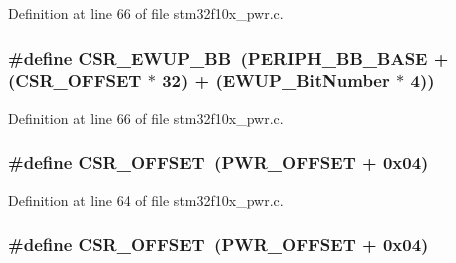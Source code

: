 Definition at line 66 of file stm32f10x\+\_\+pwr.\+c.

\subsubsection[{\texorpdfstring{C\+S\+R\+\_\+\+E\+W\+U\+P\+\_\+\+BB}{CSR_EWUP_BB}}]{\setlength{\rightskip}{0pt plus 5cm}\#define C\+S\+R\+\_\+\+E\+W\+U\+P\+\_\+\+BB~({\bf P\+E\+R\+I\+P\+H\+\_\+\+B\+B\+\_\+\+B\+A\+SE} + ({\bf C\+S\+R\+\_\+\+O\+F\+F\+S\+ET} $\ast$ 32) + ({\bf E\+W\+U\+P\+\_\+\+Bit\+Number} $\ast$ 4))}\hypertarget{group___p_w_r___private___defines_gaaff864595f697850b19173b0bca991b0}{}\label{group___p_w_r___private___defines_gaaff864595f697850b19173b0bca991b0}


Definition at line 66 of file stm32f10x\+\_\+pwr.\+c.

\subsubsection[{\texorpdfstring{C\+S\+R\+\_\+\+O\+F\+F\+S\+ET}{CSR_OFFSET}}]{\setlength{\rightskip}{0pt plus 5cm}\#define C\+S\+R\+\_\+\+O\+F\+F\+S\+ET~({\bf P\+W\+R\+\_\+\+O\+F\+F\+S\+ET} + 0x04)}\hypertarget{group___p_w_r___private___defines_ga984cbe73312b6d3d355c5053763d499a}{}\label{group___p_w_r___private___defines_ga984cbe73312b6d3d355c5053763d499a}


Definition at line 64 of file stm32f10x\+\_\+pwr.\+c.

\subsubsection[{\texorpdfstring{C\+S\+R\+\_\+\+O\+F\+F\+S\+ET}{CSR_OFFSET}}]{\setlength{\rightskip}{0pt plus 5cm}\#define C\+S\+R\+\_\+\+O\+F\+F\+S\+ET~({\bf P\+W\+R\+\_\+\+O\+F\+F\+S\+ET} + 0x04)}\hypertarget{group___p_w_r___private___defines_ga984cbe73312b6d3d355c5053763d499a}{}\label{group___p_w_r___private___defines_ga984cbe73312b6d3d355c5053763d499a}


